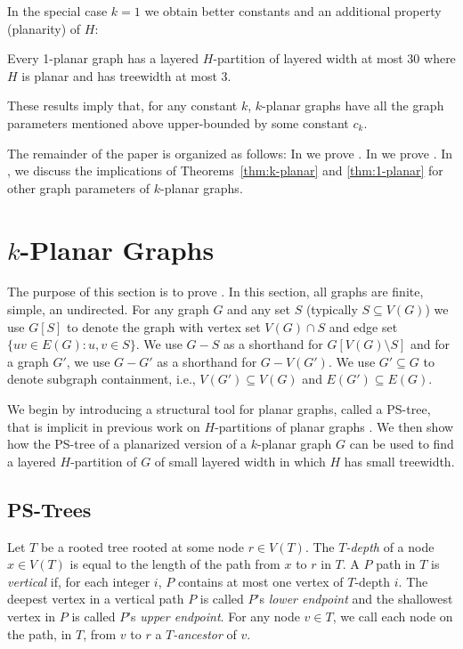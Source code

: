 \documentclass{patmorin}
\begin{document}
In the special case $k=1$ we obtain better constants and an additional property (planarity) of $H$:

\begin{thm}
  Every 1-planar graph has a layered $H$-partition of layered width at most 30 where $H$ is planar and has treewidth at most 3.
\end{thm}

These results imply that, for any constant $k$, $k$-planar graphs have all the graph parameters mentioned above upper-bounded by some constant $c_k$.

The remainder of the paper is organized as follows: In  we prove .  In  we prove .  In , we discuss the implications of Theorems~\ref{thm:k-planar} and \ref{thm:1-planar} for other graph parameters of $k$-planar graphs.


\section{$k$-Planar Graphs}

The purpose of this section is to prove .  In this section, all graphs are finite, simple, an undirected.  For any graph $G$ and any set $S$ (typically $S\subseteq V(G)$) we use $G[S]$ to denote the graph with vertex set $V(G)\cap S$ and edge set $\{uv\in E(G) : u,v\in S\}$.  We use $G-S$ as a shorthand for $G[V(G)\setminus S]$ and for a graph $G'$, we use $G-G'$ as a shorthand for $G-V(G')$.  We use $G'\subseteq G$ to denote subgraph containment, i.e., $V(G')\subseteq V(G)$ and $E(G')\subseteq E(G)$.

We begin by introducing a structural tool for planar graphs, called a PS-tree, that is implicit in previous work on $H$-partitions of planar graphs \cite{dujmovic.joret.ea:planar}.  We then show how the PS-tree of a planarized version of a $k$-planar graph $G$ can be used to find a layered $H$-partition of $G$ of small layered width in which $H$ has small treewidth. 

\subsection{PS-Trees}

Let $T$ be a rooted tree rooted at some node $r\in V(T)$. The \emph{$T$-depth} of a node $x\in V(T)$ is equal to the length of the path from $x$ to $r$ in $T$. A $P$ path in $T$ is \emph{vertical} if, for each integer $i$, $P$ contains at most one vertex of $T$-depth $i$.  The deepest vertex in a vertical path $P$ is called  $P$'s \emph{lower endpoint} and the shallowest vertex in $P$ is called $P$'s \emph{upper endpoint}. For any node $v\in T$, we call each node on the path, in $T$, from $v$ to $r$ a \emph{$T$-ancestor} of $v$.
\end{document}
